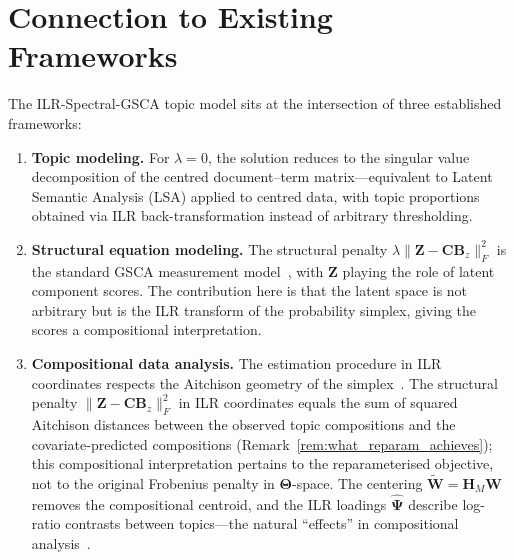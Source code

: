 \documentclass{article}
\begin{document}
\section{Connection to Existing Frameworks}
\label{sec:connections}

The ILR-Spectral-GSCA topic model sits at the intersection of three established
frameworks:
%
\begin{enumerate}
  \item \textbf{Topic modeling.}
    For $\lambda=0$, the solution reduces to the singular value
    decomposition of the centred document--term matrix---equivalent
    to Latent Semantic Analysis (LSA) applied to centred data, with
    topic proportions obtained via ILR back-transformation instead of
    arbitrary thresholding.

  \item \textbf{Structural equation modeling.}
    The structural penalty
    $\lambda\|\mathbf{Z}-\mathbf{C}\mathbf{B}_z\|_F^2$ is the standard
    GSCA measurement model~\citep{hwang2004generalized}, with
    $\mathbf{Z}$ playing the role of latent component scores.
    The contribution here is that the latent space is not arbitrary but
    is the ILR transform of the probability simplex, giving the scores
    a compositional interpretation.

  \item \textbf{Compositional data analysis.}
    The estimation procedure in ILR coordinates respects the Aitchison
    geometry of the simplex~\citep{aitchison1986statistical}. The
    structural penalty
    $\|\mathbf{Z}-\mathbf{C}\mathbf{B}_z\|_F^2$ in ILR coordinates
    equals the sum of squared Aitchison distances between the observed
    topic compositions and the covariate-predicted compositions
    (Remark~\ref{rem:what_reparam_achieves}); this compositional
    interpretation pertains to the reparameterised objective, not to
    the original Frobenius penalty in $\boldsymbol{\Theta}$-space.
    The centering $\widetilde{\mathbf{W}} = \mathbf{H}_M\mathbf{W}$
    removes the compositional centroid, and the ILR loadings
    $\hat{\boldsymbol{\Psi}}$ describe log-ratio contrasts between
    topics---the natural ``effects'' in compositional
    analysis~\citep{egozcue2003isometric,
    pawlowskyglahn2015modeling}.
\end{enumerate}


\end{document}

